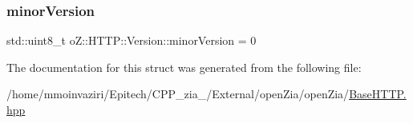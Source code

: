 \subsubsection{\texorpdfstring{minorVersion}{minorVersion}}
{\footnotesize\ttfamily std\+::uint8\+\_\+t o\+Z\+::\+H\+T\+T\+P\+::\+Version\+::minor\+Version = 0}



The documentation for this struct was generated from the following file\+:\begin{DoxyCompactItemize}
\item 
/home/mmoinvaziri/\+Epitech/\+C\+P\+P\+\_\+zia\+\_/\+External/open\+Zia/open\+Zia/\mbox{\hyperlink{_base_h_t_t_p_8hpp}{Base\+H\+T\+T\+P.\+hpp}}\end{DoxyCompactItemize}
